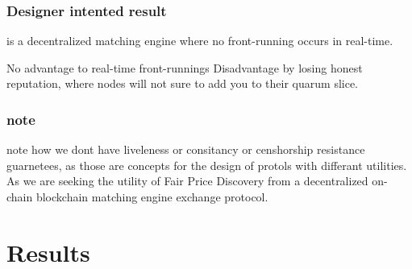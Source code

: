 \documentclass[12pt]{article}
\begin{document}
\subsubsection{Designer intented result} is a decentralized matching engine where no front-running occurs in real-time. 

No advantage to real-time front-runnings 
Disadvantage by losing honest reputation, where nodes will not sure to add you to their quarum slice.  

\subsubsection{note}
note how we dont have liveleness or consitancy or censhorship resistance guarnetees, as those are concepts for the design of protols with differant utilities. As we are seeking the utility of Fair Price Discovery from a decentralized on-chain blockchain matching engine exchange protocol. 


\section{Results}
\cite{ChenA} 
\newpage
{}

% 
\end{document}
